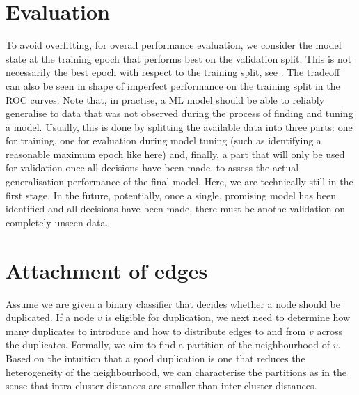 \documentclass[
	fontsize=10pt, %
	twoside=false, %
	secnumdepth=1, %
  toc=indentunnumbered %
]{kaobook}
\begin{document}
\section{Evaluation}


To avoid overfitting, for overall performance evaluation, we consider
the model state at the training epoch that performs best on the validation
split. This is not necessarily the best epoch with respect to the training split, see
. The tradeoff can also be seen in shape of imperfect
performance on the training split in the ROC curves.
% 
%
Note that, in practise, a ML model should be able to reliably generalise to data
that was not observed during the process of finding and tuning a model. Usually,
this is done by splitting the available data into three parts: one for training,
one for evaluation during model tuning (such as identifying a reasonable maximum
epoch like here) and, finally, a part that will only be used for validation once
all decisions have been made, to assess the actual generalisation performance of
the final model.
%
Here, we are technically still in the first stage. In the future, potentially,
once a single, promising model has been identified and all decisions have been
made, there must be anothe validation on completely unseen data.

\section{Attachment of edges}
\label{sec:edge attachment}


Assume we are given a binary classifier that decides whether a node should be
duplicated. If a node $v$ is eligible for duplication, we next need to determine
how many duplicates to introduce and how to distribute edges to and from $v$
across the duplicates. Formally, we aim to find a partition of the neighbourhood
of $v$. Based on the intuition that a good duplication is one that reduces the
heterogeneity of the neighbourhood, we can characterise the partitions as
 in the sense that intra-cluster distances are smaller than
inter-cluster distances.
\end{document}
